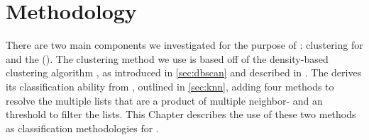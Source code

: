 \chapter{Methodology}\label{chap:methodology}
There are two main components we investigated for the purpose of \mst{}: 
clustering for \bslongs{}
and
the \kraplong{} (\krap{}).
The clustering method we use is based off of the density-based clustering algorithm \dbscan, as introduced in \autoref{sec:dbscan} and described in \cite{johnson2015density}.
The \krap{} derives its classification ability from \kNNlong{}, outlined in \autoref{sec:knn}, adding four methods to resolve the multiple \knnlong{} lists that are a product of multiple neighbor-\compfuncs{} and an \a{} threshold to filter the \knnlong{} lists.
This Chapter describes the use of these two methods as classification methodologies for \cplop{}.






